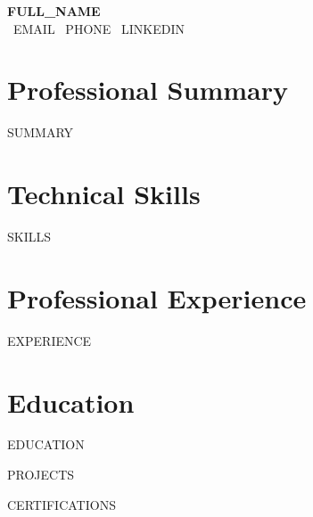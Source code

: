 \documentclass[11pt,a4paper]{article}
\begin{document}
\begin{center}
    {\huge\bfseries\color{primary} {{FULL_NAME}}} \\
    \vspace{0.5em}
    \faEnvelope\ {{EMAIL}} \quad
    \faPhone\ {{PHONE}} \quad
    \faLinkedin\ {{LINKEDIN}}
\end{center}

\section{Professional Summary}
{{SUMMARY}}

\section{Technical Skills}
\begin{itemize}[leftmargin=0.5in]
    {{SKILLS}}
\end{itemize}

\section{Professional Experience}
\begin{itemize}[leftmargin=0.5in]
    {{EXPERIENCE}}
\end{itemize}

\section{Education}
\begin{itemize}[leftmargin=0.5in]
    {{EDUCATION}}
\end{itemize}

{{PROJECTS}}

{{CERTIFICATIONS}}
\end{document}
